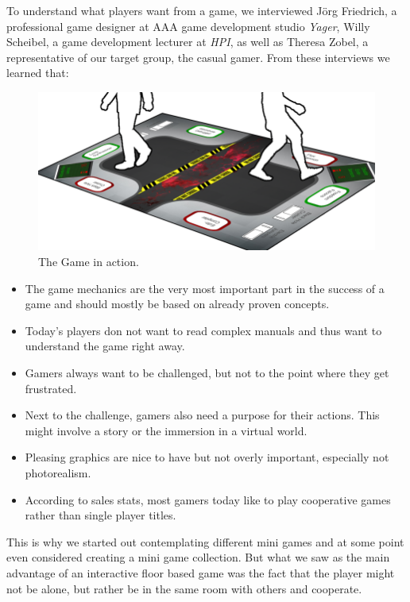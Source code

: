 \documentclass{sigchi}
\begin{document}
To understand what players want from a game, we interviewed J\"org Friedrich, a professional game designer at AAA game development studio \textit{Yager}, Willy Scheibel, a game development lecturer at \textit{HPI}, as well as Theresa Zobel, a representative of our target group, the casual gamer. From these interviews we learned that:

\begin{figure}[H]
\centering
\includegraphics[width=0.99\columnwidth]{walkthrough/totale2}
\caption{The Game in action.}
\label{fig:figure1}
\end{figure}

\begin{itemize}
\item The game mechanics are the very most important part in the success of a game and should mostly be based on already proven concepts.
\item Today's players don not want to read complex manuals and thus want to understand the game right away.
\item Gamers always want to be challenged, but not to the point where they get frustrated.
\item Next to the challenge, gamers also need a purpose for their actions. This might involve a story or the immersion in a virtual world.
\item Pleasing graphics are nice to have but not overly important, especially not photorealism.
\item According to sales stats, most gamers today like to play cooperative games rather than single player titles.
\end{itemize}

\vspace{4mm}
This is why we started out contemplating different mini games and at some point even considered creating a mini game collection. But what we saw as the main advantage of an interactive floor based game was the fact that the player might not be alone, but rather be in the same room with others and cooperate. 
\end{document}
